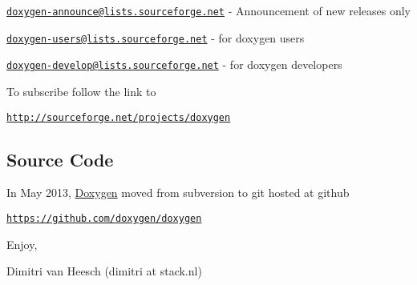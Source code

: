 \begin{DoxyItemize}
\item \href{mailto:doxygen-announce@lists.sourceforge.net}{\tt doxygen-\/announce@lists.\+sourceforge.\+net} -\/ Announcement of new releases only
\item \href{mailto:doxygen-users@lists.sourceforge.net}{\tt doxygen-\/users@lists.\+sourceforge.\+net} -\/ for doxygen users
\item \href{mailto:doxygen-develop@lists.sourceforge.net}{\tt doxygen-\/develop@lists.\+sourceforge.\+net} -\/ for doxygen developers
\item To subscribe follow the link to
\begin{DoxyItemize}
\item \href{http://sourceforge.net/projects/doxygen}{\tt http\+://sourceforge.\+net/projects/doxygen}
\end{DoxyItemize}
\end{DoxyItemize}

\subsection*{Source Code }

In May 2013, \hyperlink{class_doxygen}{Doxygen} moved from subversion to git hosted at github
\begin{DoxyItemize}
\item \href{https://github.com/doxygen/doxygen}{\tt https\+://github.\+com/doxygen/doxygen}
\end{DoxyItemize}

Enjoy,

Dimitri van Heesch (dimitri at stack.\+nl) 